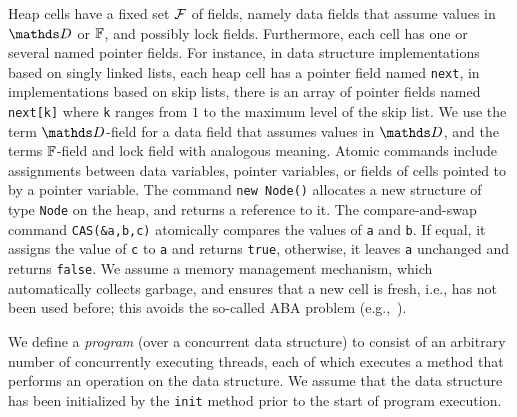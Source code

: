 %
Heap cells have a fixed set $\mathcal{F}$ of fields, namely
data fields that assume values in
$\ddomain$ or $\mathbb{F}$, and possibly lock fields.
Furthermore, each cell has one or several named pointer fields.
For instance, in data structure implementations based on singly linked lists,
each heap cell has a pointer field named {\tt next}, in implementations
based on skip lists, there is an array of pointer fields named
{\tt next[k]} where {\tt k} ranges from $1$ to the maximum level of the
skip list.
We use the term $\ddomain$-field for a data field that
assumes values in $\ddomain$, and the terms $\mathbb{F}$-field and lock field
with analogous meaning.
Atomic commands include assignments between data variables, 
pointer variables, or fields of cells pointed to by a pointer variable.
%
The command {\tt new Node()} allocates a new structure of type
{\tt Node} on the heap, and returns a reference to it.
%
The compare-and-swap command {\tt CAS(\&a,b,c)} atomically
compares the values of {\tt a} and {\tt b}.
If  equal, it assigns the value of
{\tt c} to {\tt a}  and returns {\tt true}, 
otherwise, it leaves {\tt a} unchanged and returns {\tt false}. 
%
We assume a memory management mechanism, which automatically collects
garbage, and ensures that a new cell is fresh, i.e., has
not been used before; this avoids the so-called
ABA problem (e.g.,~\cite{MS:QueueAlgorithms}).

We define a {\em program} (over a concurrent data structure) to consist 
of an arbitrary number of concurrently executing threads, each of which
executes a method that performs an operation
on the data structure. We assume that the data structure has been initialized
by the {\tt init} method prior to the start of program execution.

